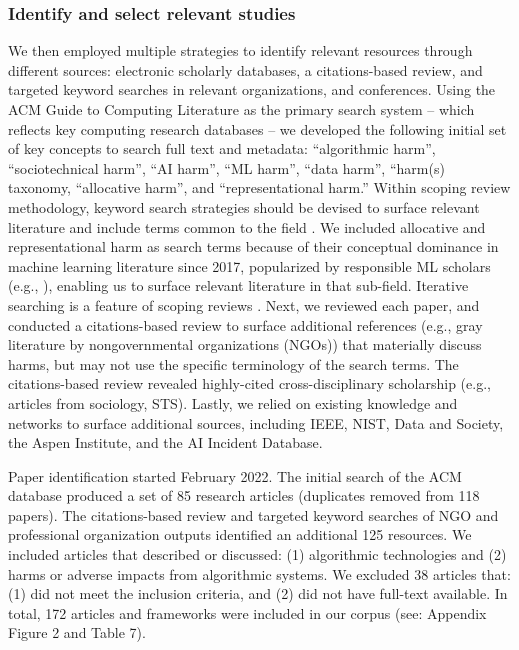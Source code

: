 \subsubsection{Identify and select relevant studies}
We then employed multiple strategies to identify relevant resources through different sources: electronic scholarly databases, a citations-based review, and targeted keyword searches in relevant organizations, and conferences. Using the ACM Guide to Computing Literature as the primary search system – which reflects key computing research databases – we developed the following initial set of key concepts to search full text and metadata: “algorithmic harm”, “sociotechnical harm”, “AI harm”, “ML harm”, “data harm”, “harm(s) taxonomy, “allocative harm”, and “representational harm.” Within scoping review methodology, keyword search strategies should be devised to surface relevant literature \cite{arksey2005scoping} and include terms common to the field \cite{hanneke2017scoping}. We included allocative and representational harm as search terms because of their conceptual dominance in machine learning literature since 2017, popularized by responsible ML scholars (e.g., \cite{barocas2017problem, Crawford_2017}), enabling us to surface relevant literature in that sub-field. Iterative searching is a feature of scoping reviews \cite{pollock_2021}. Next, we reviewed each paper, and conducted a citations-based review to surface additional references (e.g., gray literature by nongovernmental organizations (NGOs)) that materially discuss harms, but may not use the specific terminology of the search terms. The citations-based review revealed highly-cited cross-disciplinary scholarship (e.g., articles from sociology, STS). Lastly, we relied on existing knowledge and networks to surface additional sources, including IEEE, NIST, Data and Society, the Aspen Institute, and the AI Incident Database. 

Paper identification started February 2022. The initial search of the ACM database produced a set of 85 research articles (duplicates removed from 118 papers). The citations-based review and targeted keyword searches of NGO and professional organization outputs identified an additional 125 resources. We included articles that described or discussed: (1) algorithmic technologies and (2) harms or adverse impacts from algorithmic systems. We excluded 38 articles that: (1) did not meet the inclusion criteria, and (2) did not have full-text available. In total, 172 articles and frameworks were included in our corpus (see: Appendix Figure 2 and Table 7). 

